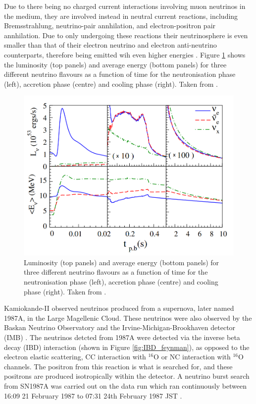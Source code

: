 Due to there being no charged current interactions involving muon neutrinos in the medium, they are involved instead in neutral current reactions, including Bremsstrahlung, neutrino-pair annhilation, and electron-positron pair annhilation. Due to only undergoing these reactions their neutrinosphere is even smaller than that of their electron neutrino and electron anti-neutrino counterparts, therefore being emitted wih even higher energies \cite{nagakura_non-thermal_2021}. Figure \ref{fig:ccsn_nu_flavor_energy} shows the luminosity (top panels) and average energy (bottom panels) for three different neutrino flavours as a function of time for the neutronisation phase (left), accretion phase (centre) and cooling phase (right). Taken from \cite{chakraborty_observing_2014}.

\begin{figure}
    \includegraphics[width=\textwidth]{Figures/ccsn_nu_flavor_energy.png}
    \caption{Luminosity (top panels) and average energy (bottom panels) for three different neutrino flavours as a function of time for the neutronisation phase (left), accretion phase (centre) and cooling phase (right). Taken from \cite{chakraborty_observing_2014}. }
    \label{fig:ccsn_nu_flavor_energy}
\end{figure}



Kamiokande-II observed neutrinos produced from a supernova, later named 1987A, in the Large Magellenic Cloud. These neutrinos were also observed by the Baskan Neutrino Observatory and the Irvine-Michigan-Brookhaven detector (IMB) \cite{hirata_observation_1987}. The neutrinos detcted from 1987A were detected via the inverse beta decay (IBD) interaction (shown in Figure \ref{fig:IBD_feynman}), as opposed to the electron elastic scattering, CC interaction with ${ }^{16} \mathrm{O}$ or NC interaction with  ${ }^{16} \mathrm{O}$ channels. The positron from this reaction is what is searched for, and these positrons are produced isotropically within the detector. A neutrino burst search from SN1987A was carried out on the data run which ran continuously between 16:09 21 February 1987 to 07:31 24th February 1987 JST \cite{Hirata:1988ad}.

